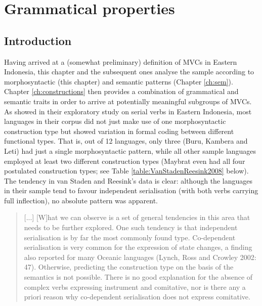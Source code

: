 \chapter{Grammatical properties}\label{ch:gram}
\section{Introduction}

Having arrived at a (somewhat preliminary) definition of MVCs in Eastern Indonesia, this chapter and the subsequent ones analyse the sample according to morphosyntactic (this chapter) and semantic patterns (Chapter \ref{ch:sem}). Chapter \ref{ch:constructions} then provides a combination of grammatical and semantic traits in order to arrive at potentially meaningful subgroups of MVCs. As \citet{vanstaden2008serial} showed in their exploratory study on serial verbs in Eastern Indonesia, most languages in their corpus did not just make use of one morphosyntactic construction type but showed variation in formal coding between different functional types. That is, out of 12 languages, only three (Buru, Kambera and Leti) had just a single morphosyntactic pattern, while all other sample languages employed at least two different construction types (Maybrat even had all four postulated construction types; see Table \ref{table:VanStadenReesink2008} below). The tendency in van Staden and Reesink's data is clear: although the languages in their sample tend to favour independent serialisation (with both verbs carrying full inflection), no absolute pattern was apparent.

\begin{quote}
[...] [W]hat we can observe is a set of general tendencies in this area that needs to be further explored. One such tendency is that independent serialisation is by far the most commonly found type. Co-dependent serialisation is very common for the expression of state changes, a finding also reported for many Oceanic languages (Lynch, Ross and Crowley 2002: 47). Otherwise, predicting the construction type on the basis of the semantics is not possible. There is no good explanation for the absence of complex verbs expressing instrument and comitative, nor is there any a priori reason why co-dependent serialisation does not express comitative. \citep[48]{vanstaden2008serial}\end{quote}

